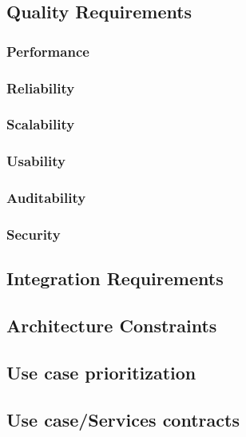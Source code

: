 \documentclass[a4paper,12pt]{article}
\begin{document}
\newpage
\subsection{Quality Requirements}

\subsubsection{Performance}

\subsubsection{Reliability}

\subsubsection{Scalability}

\subsubsection{Usability} 

\subsubsection{Auditability}

\subsubsection{Security}

\newpage
\subsection{Integration Requirements}

\newpage
\subsection{Architecture Constraints}

\newpage
\subsection{Use case prioritization}

\newpage
\subsection{Use case/Services contracts}
\end{document}
